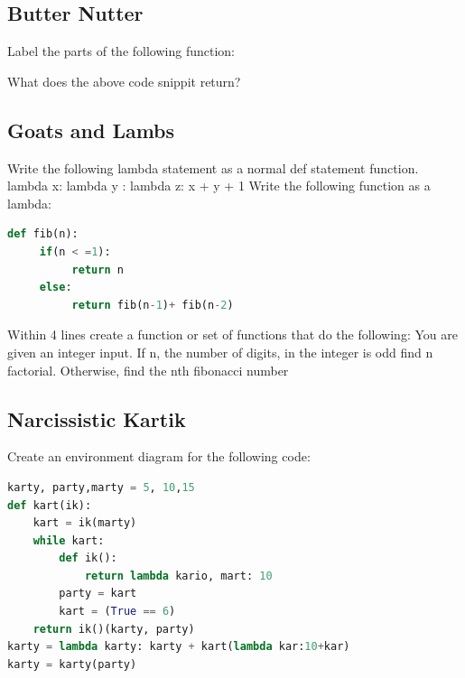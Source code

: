 \documentclass{article}
\begin{document}
\subsection{Butter Nutter}
\begin{subq}
 \subqs Label the parts of the following function: 
 
  \bigskip
 
 \subqs What does the above code snippit return? 
\bigskip

\bigskip
\end{subq}
\subsection{Goats and Lambs}
\begin{subq}
\subqs Write the following lambda statement as a normal def statement function. lambda x:  lambda y : lambda z: x + y + 1
\bigskip
\bigskip
\bigskip
\bigskip
\bigskip
\bigskip
\bigskip
\bigskip
\bigskip
\bigskip
\bigskip
\bigskip
\subqs Write the following function as a lambda: 
\begin{lstlisting}[language = Python]
def fib(n):
     if(n < =1):
          return n
     else:
          return fib(n-1)+ fib(n-2)
\end{lstlisting}
\newpage

\subqs Within 4 lines create a function or set of functions that do the following: 
You are given an integer input. If n, the number of digits, in the integer is odd find n factorial. Otherwise, find the nth fibonacci number
\bigskip
\bigskip
\bigskip
\bigskip
\bigskip
\bigskip
\end{subq}
\subsection{Narcissistic Kartik}
\begin{subq}
\subqs Create an environment diagram for the following code:
\begin{lstlisting}[language = Python]
karty, party,marty = 5, 10,15
def kart(ik):
    kart = ik(marty)
    while kart:
        def ik():
            return lambda kario, mart: 10
        party = kart
        kart = (True == 6)
    return ik()(karty, party)
karty = lambda karty: karty + kart(lambda kar:10+kar)
karty = karty(party)
\end{lstlisting}
\bigskip
\bigskip
\bigskip
\bigskip
\bigskip
\bigskip\bigskip
\bigskip
\bigskip
\bigskip
\bigskip
\bigskip
\bigskip
\bigskip
\bigskip
\bigskip
\bigskip
\bigskip
\end{subq}
\end{document}
